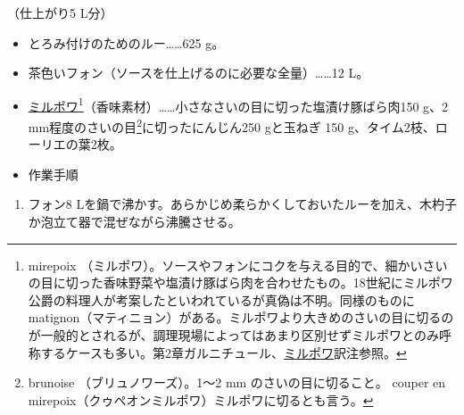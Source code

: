 \begin{recette}


（仕上がり5 L分）

\begin{itemize}
\item
  とろみ付けのためのルー\ldots{}\ldots{}625 g。
\item
  茶色いフォン（ソースを仕上げるのに必要な全量）\ldots{}\ldots{}12 L。
\item
  \protect\hyperlink{mirepoix}{ミルポワ}\footnote{mirepoix
    （ミルポワ）。ソースやフォンにコクを与える目的で、細かいさいの目に切った香味野菜や塩漬け豚ばら肉を合わせたもの。18世紀にミルポワ公爵の料理人が考案したといわれているが真偽は不明。同様のものにmatignon（マティニョン）がある。ミルポワより大きめのさいの目に切るのが一般的とされるが、調理現場によってはあまり区別せずミルポワとのみ呼称するケースも多い。第2章ガルニチュール、\protect\hyperlink{mirepoix}{ミルポワ}訳注参照。}（香味素材）\ldots{}\ldots{}小さなさいの目に切った塩漬け豚ばら肉150
  g、2 mm程度のさいの目\footnote{brunoise （ブリュノワーズ）。1〜2 mm
    のさいの目に切ること。 couper en
    mirepoix（クゥペオンミルポワ）ミルポワに切るとも言う。}に切ったにんじん250
  gと玉ねぎ 150
  g、タイム2枝、ローリエの葉2枚。
\item
  作業手順
\end{itemize}

\begin{enumerate}
\def\labelenumi{\arabic{enumi}.}
\item
  フォン8
  Lを鍋で沸かす。あらかじめ柔らかくしておいたルーを加え、木杓子か泡立て器で混ぜながら沸騰させる。


\end{enumerate}
\end{recette}
